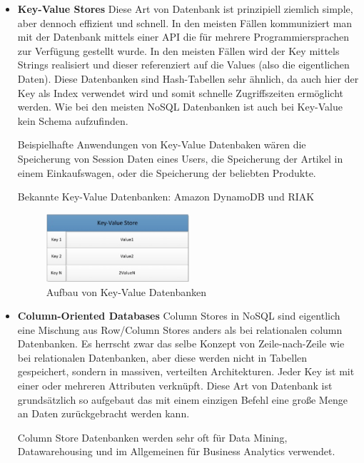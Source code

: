\begin{itemize}
	\item \textbf{Key-Value Stores\newline}
	Diese Art von Datenbank ist prinzipiell ziemlich simple, aber dennoch effizient und schnell. In den meisten Fällen kommuniziert man mit der Datenbank mittels einer API die für mehrere Programmiersprachen zur Verfügung gestellt wurde. In den meisten Fällen wird der Key mittels Strings realisiert und dieser referenziert auf die Values (also die eigentlichen Daten). Diese Datenbanken sind Hash-Tabellen sehr ähnlich, da auch hier der Key als Index verwendet wird und somit schnelle Zugriffszeiten ermöglicht werden. Wie bei den meisten NoSQL Datenbanken ist auch bei Key-Value kein Schema aufzufinden.

	Beispielhafte Anwendungen von Key-Value Datenbaken wären die Speicherung von Session Daten eines Users, die Speicherung der Artikel in einem Einkaufswagen, oder die Speicherung der beliebten Produkte.

	Bekannte Key-Value Datenbanken: Amazon DynamoDB und RIAK

	\begin{figure}[!htb]\centering
		\includegraphics[width=0.5\textwidth]{images/keyvalueStore}
		\caption{Aufbau von Key-Value Datenbanken}
	\end{figure}

	\clearpage

	\item \textbf{Column-Oriented Databases\newline}
	Column Stores in NoSQL sind eigentlich eine Mischung aus Row/Column Stores anders als bei relationalen column Datenbanken. Es herrscht zwar das selbe Konzept von Zeile-nach-Zeile wie bei relationalen Datenbanken, aber diese werden nicht in Tabellen gespeichert, sondern in massiven, verteilten Architekturen. Jeder Key ist mit einer oder mehreren Attributen verknüpft. Diese Art von Datenbank ist grundsätzlich so aufgebaut das mit einem einzigen Befehl eine große Menge an Daten zurückgebracht werden kann. 

	Column Store Datenbanken werden sehr oft für Data Mining, Datawarehousing und im Allgemeinen für Business Analytics verwendet.


\end{itemize}
